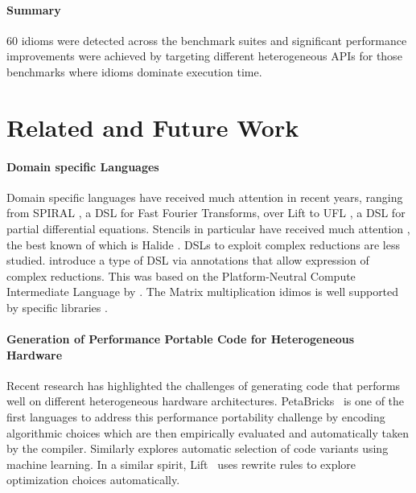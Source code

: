 {\paragraph*{Summary}

    60 idioms were detected across the benchmark suites and significant
    performance improvements were achieved by targeting different heterogeneous
    APIs for those benchmarks where idioms dominate execution time.

\section{Related and Future Work}

\paragraph*{Domain specific Languages}
    Domain specific languages have received much attention in recent years,
    ranging from SPIRAL \citep{ofenbeck13spiral}, a DSL for Fast Fourier
    Transforms, over Lift \citep{steuwer15rewrite, SteuwerRD17,HagedornSSGD18}
    to UFL \citep{Alnaes:2014:UFL:2594412.2566630}, a DSL for partial
    differential equations.
    Stencils in particular have received much attention
    \citep{Mullapudi:2015:PAO:2694344.2694364,HagedornSSGD18}, the best known of
    which is Halide \citep{Ragan-Kelley2013Halide}.
    DSLs to exploit complex reductions are less studied.
    \citet{Reddy2016Reduction} introduce a type of DSL via annotations
    that allow expression of complex reductions.
    This was based on the  Platform-Neutral Compute Intermediate Language by
    \citet{baghdadi2015PENCIL}.
    The Matrix multiplication idimos is well supported by
    specific libraries \citep{clblas,mkl,cublas}.

\paragraph*{Generation of Performance Portable Code for Heterogeneous Hardware}
    Recent research has highlighted the challenges of generating code that
    performs well on different heterogeneous hardware architectures.
    PetaBricks~\cite{PhothilimthanaARA13} is one of the first languages to
    address this performance portability challenge by encoding algorithmic
    choices which are then empirically evaluated and automatically taken by the
    compiler.
    Similarly \cite{MuralidharanRHG16} explores automatic selection of code
    variants using machine learning.
    In a similar spirit, Lift~\cite{steuwer15rewrite} uses rewrite rules to
    explore optimization choices automatically.

}
